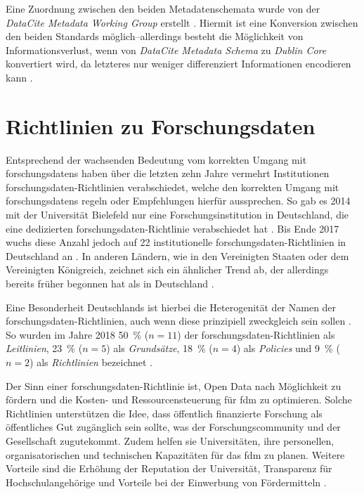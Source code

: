 Eine Zuordnung zwischen den beiden Metadatenschemata wurde von der \textit{DataCite Metadata Working Group} erstellt \autocite{datacite-mapping}.
Hiermit ist eine Konversion zwischen den beiden Standards möglich--allerdings besteht die Möglichkeit von Informationsverlust, wenn von \textit{DataCite Metadata Schema} zu \textit{Dublin Core} konvertiert wird, da letzteres nur weniger differenziert Informationen encodieren kann \autocite{datacite-mapping}.

\section{Richtlinien zu Forschungsdaten}\label{sec:forschungsstand-guidelines}
Entsprechend der wachsenden Bedeutung vom korrekten Umgang mit \glspl{forschungsdaten} haben über die letzten zehn Jahre vermehrt Institutionen \gls{forschungsdaten}-Richtlinien verabschiedet, welche den korrekten Umgang mit \glspl{forschungsdaten} regeln oder Empfehlungen hierfür aussprechen.
So gab es 2014 mit der Universität Bielefeld nur eine Forschungsinstitution in Deutschland, die eine dedizierten \gls{forschungsdaten}-Richtlinie verabschiedet hat \autocite[6]{hrk-fdm}. 
Bis Ende 2017 wuchs diese Anzahl jedoch auf \num{22} institutionelle \gls{forschungsdaten}-Richtlinien in Deutschland an \autocite{Hiemenz2018-fdm-report}.
In anderen Ländern, wie in den Vereinigten Staaten oder dem Vereinigten Königreich, zeichnet sich ein ähnlicher Trend ab, der allerdings bereits früher begonnen hat als in Deutschland \autocite{hrk-fdm,Briney2015-Policy}.

Eine Besonderheit Deutschlands ist hierbei die Heterogenität der Namen der \gls{forschungsdaten}-Richtlinien, auch wenn diese prinzipiell zweckgleich sein sollen \autocite{Hiemenz2018-fdm-title,Hiemenz2018-fdm-title}.
So wurden im Jahre 2018 \SI{50}{\percent} ($n=11$) der \gls{forschungsdaten}-Richtlinien als \textit{Leitlinien}, \SI{23}{\percent} ($n=5$) als \textit{Grundsätze}, \SI{18}{\percent} ($n=4$) als \textit{Policies} und \SI{9}{\percent} ($n=2$) als \textit{Richtlinien} bezeichnet \autocite[5]{Hiemenz2018-fdm-title}.

Der Sinn einer \gls{forschungsdaten}-Richtlinie ist, Open Data nach Möglichkeit zu fördern und die Kosten- und Ressourcensteuerung für \gls{fdm} zu optimieren.
Solche Richtlinien unterstützen die Idee, dass öffentlich finanzierte Forschung als öffentliches Gut zugänglich sein sollte, was der Forschungscommunity und der Gesellschaft zugutekommt.
Zudem helfen sie Universitäten, ihre personellen, organisatorischen und technischen Kapazitäten für das \gls{fdm} zu planen.
Weitere Vorteile sind die Erhöhung der Reputation der Universität, Transparenz für Hochschulangehörige und Vorteile bei der Einwerbung von Fördermitteln \autocite{Hiemenz2018-fdm-title,Hiemenz2018-fdm-report}.

